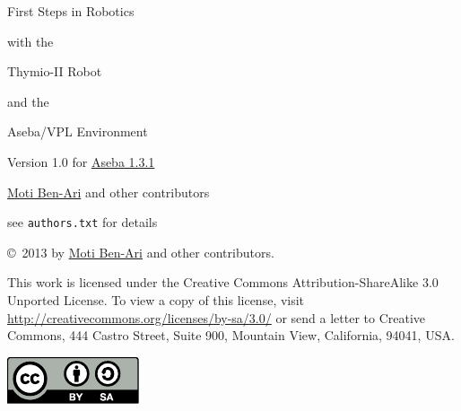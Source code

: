 \thispagestyle{empty}

\begin{center}
\begin{LARGE}
\begin{bfseries}
First Steps in Robotics

with the

Thymio-II Robot

and the

Aseba/VPL Environment
\end{bfseries}
\end{LARGE}

\bigskip\bigskip

\begin{Large}
Version 1.0 for \href{https://aseba.wikidot.com/en:downloadinstall}{Aseba 1.3.1}
\end{Large}

\bigskip\bigskip

\begin{LARGE}
\href{http://www.weizmann.ac.il/sci-tea/benari/}{Moti Ben-Ari} and other contributors\\
\end{LARGE}
\bigskip
\begin{Large}
see \texttt{authors.txt} for details
\end{Large}

\bigskip


\end{center}

\vfill

\begin{center}
\copyright{}\  2013 by \href{http://www.weizmann.ac.il/sci-tea/benari/}{Moti Ben-Ari} and other contributors.
\end{center}

This work is licensed under the Creative Commons
Attribution-ShareAlike 3.0 Unported License. To view a copy
of this license, visit
\url{http://creativecommons.org/licenses/by-sa/3.0/}
or send a letter to Creative Commons, 444 Castro Street, Suite 900,
Mountain View, California, 94041, USA.

\begin{center}
\includegraphics[width=.2\textwidth]{../images/by-sa}
\end{center}

\tableofcontents
\thispagestyle{empty}
